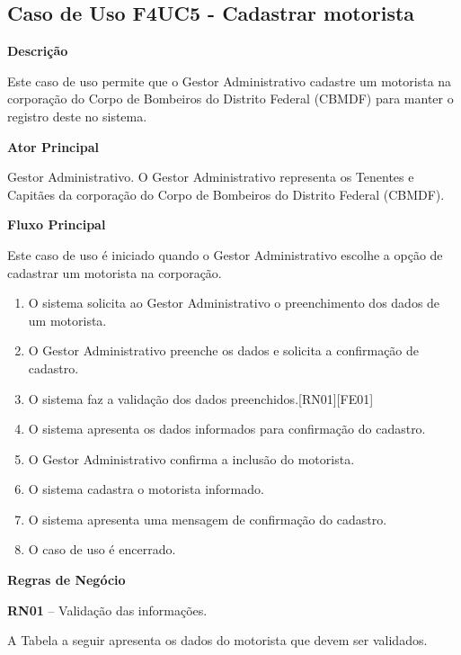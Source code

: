 
  \subsection{Caso de Uso F4UC5 - Cadastrar motorista}

  {\raggedright
      \textbf{Descrição}
  }

    Este caso de uso permite que o Gestor Administrativo cadastre um motorista na corporação do Corpo de Bombeiros do Distrito Federal
    (CBMDF) para manter o registro deste no sistema.
    
  {\raggedright
      \textbf{Ator Principal}
  }

    Gestor Administrativo. O Gestor Administrativo representa os Tenentes e Capitães da corporação do Corpo de Bombeiros do Distrito
    Federal (CBMDF).

  {\raggedright
      \textbf{Fluxo Principal}
  }
  
    Este caso de uso é iniciado quando o Gestor Administrativo escolhe a opção de cadastrar um motorista na corporação.
    
  
  \begin{enumerate}
    \item O sistema solicita ao Gestor Administrativo o preenchimento dos dados de um motorista.
    \item O Gestor Administrativo preenche os dados e solicita a confirmação de cadastro.
    \item O sistema faz a validação dos dados preenchidos.[RN01][FE01]
    \item O sistema apresenta os dados informados para confirmação do cadastro.
    \item O Gestor Administrativo confirma a inclusão do motorista.
    \item O sistema cadastra o motorista informado.
    \item O sistema apresenta uma mensagem de confirmação do cadastro.
    \item O caso de uso é encerrado.
    
  \end{enumerate}
  
  
   {\raggedright
      \textbf{Regras de Negócio}
   }
   
   \textbf{RN01} – Validação das informações.
   
   A Tabela a seguir apresenta os dados do motorista que devem ser validados.
   
